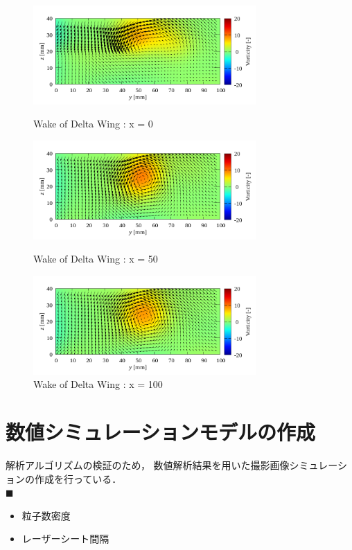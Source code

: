 \documentclass[twocolumn,a4j]{jsarticle}
\begin{document}
\begin{figure}[htbp]
  \centering
  \includegraphics[keepaspectratio, width=85mm]{../images/Delta_x=0/time-averaged_vectors/velocity_and_vorticity.png}
  \caption{Wake of Delta Wing : x = 0}
  \includegraphics[keepaspectratio, width=85mm]{../images/Delta_x=50/time-averaged_vectors/velocity_and_vorticity.png}
  \caption{Wake of Delta Wing : x = 50}
  \includegraphics[keepaspectratio, width=85mm]{../images/Delta_x=100/time-averaged_vectors/velocity_and_vorticity.png}
  \caption{Wake of Delta Wing : x = 100}
\end{figure}


\newpage
\section{数値シミュレーションモデルの作成}
解析アルゴリズムの検証のため，
数値解析結果を用いた撮影画像シミュレーションの作成を行っている．\\
$\blacksquare$ 
\begin{itemize}
  \item 粒子数密度
  \item レーザーシート間隔
\end{itemize}
\end{document}
